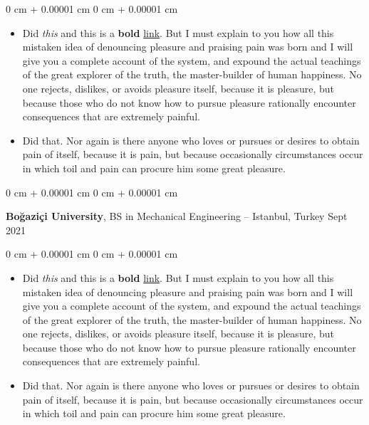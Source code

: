 \documentclass[10pt, letterpaper]{article}
\newenvironment{highlights}{
    \begin{itemize}[
        topsep=0.10 cm,
        parsep=0.10 cm,
        partopsep=0pt,
        itemsep=0pt,
        leftmargin=0 cm + 10pt
    ]
}{
    \end{itemize}
} %
\newenvironment{onecolentry}{
    \begin{adjustwidth}{
        0 cm + 0.00001 cm
    }{
        0 cm + 0.00001 cm
    }
}{
    \end{adjustwidth}
} %
\newenvironment{twocolentry}[2][]{
    \onecolentry
    \def\secondColumn{#2}
    \setcolumnwidth{\fill, 4.5 cm}
    \begin{paracol}{2}
}{
    \switchcolumn \raggedleft \secondColumn
    \end{paracol}
    \endonecolentry
} %
\begin{document}
        \vspace{0.10 cm}
        \begin{onecolentry}
            \begin{highlights}
                \item Did \textit{this} and this is a \textbf{bold} \href{https://example.com}{link}. But I must explain to you how all this mistaken idea of denouncing pleasure and praising pain was born and I will give you a complete account of the system, and expound the actual teachings of the great explorer of the truth, the master-builder of human happiness. No one rejects, dislikes, or avoids pleasure itself, because it is pleasure, but because those who do not know how to pursue pleasure rationally encounter consequences that are extremely painful.
                \item Did that. Nor again is there anyone who loves or pursues or desires to obtain pain of itself, because it is pain, but because occasionally circumstances occur in which toil and pain can procure him some great pleasure.
            \end{highlights}
        \end{onecolentry}


        \vspace{0.2 cm}

        \begin{twocolentry}{
            Sept 2021
        }
            \textbf{Boğaziçi University}, BS in Mechanical Engineering -- Istanbul, Turkey\end{twocolentry}

        \vspace{0.10 cm}
        \begin{onecolentry}
            \begin{highlights}
                \item Did \textit{this} and this is a \textbf{bold} \href{https://example.com}{link}. But I must explain to you how all this mistaken idea of denouncing pleasure and praising pain was born and I will give you a complete account of the system, and expound the actual teachings of the great explorer of the truth, the master-builder of human happiness. No one rejects, dislikes, or avoids pleasure itself, because it is pleasure, but because those who do not know how to pursue pleasure rationally encounter consequences that are extremely painful.
                \item Did that. Nor again is there anyone who loves or pursues or desires to obtain pain of itself, because it is pain, but because occasionally circumstances occur in which toil and pain can procure him some great pleasure.
            \end{highlights}
        \end{onecolentry}
\end{document}
